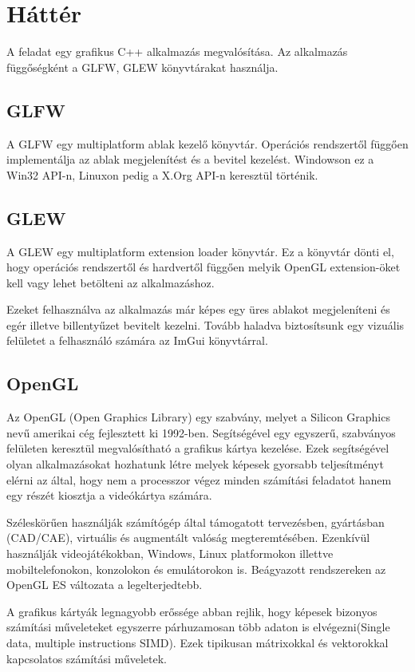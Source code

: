 \chapter{Háttér}

A feladat egy grafikus C++ alkalmazás megvalósítása. Az alkalmazás függőségként a GLFW, GLEW könyvtárakat használja.

\section{GLFW}
A GLFW egy multiplatform ablak kezelő könyvtár. Operációs rendszertől függően implementálja az ablak megjelenítést és a bevitel kezelést. Windowson ez a Win32 API-n, Linuxon pedig a X.Org API-n keresztül történik.

\section{GLEW}
A GLEW egy multiplatform extension loader könyvtár. Ez a könyvtár dönti el, hogy operációs rendszertől és hardvertől függően melyik OpenGL extension-öket kell vagy lehet betölteni az alkalmazáshoz.

Ezeket felhasználva az alkalmazás már képes egy üres ablakot megjeleníteni és egér illetve  billentyűzet bevitelt kezelni. Tovább haladva biztosítsunk egy vizuális felületet a felhasználó számára az ImGui könyvtárral.

\section{OpenGL}

Az OpenGL \cite{OpenGL} (Open Graphics Library) egy szabvány, melyet a Silicon Graphics nevű amerikai cég fejlesztett ki 1992-ben. Segítségével egy egyszerű, szabványos felületen keresztül megvalósítható a grafikus kártya kezelése. Ezek segítségével olyan alkalmazásokat hozhatunk létre melyek képesek gyorsabb teljesítményt elérni az által, hogy nem a processzor végez minden számítási feladatot hanem egy részét kiosztja a videókártya számára. 

Széleskörűen használják számítógép által támogatott tervezésben, gyártásban (CAD/CAE), virtuális és augmentált valóság megteremtésében. Ezenkívül használják videojátékokban, Windows, Linux platformokon illettve mobiltelefonokon, konzolokon és emulátorokon is. Beágyazott rendszereken az OpenGL ES változata a legelterjedtebb.

A grafikus kártyák legnagyobb erőssége abban rejlik, hogy képesek bizonyos számítási műveleteket egyszerre párhuzamosan több adaton is elvégezni(Single data, multiple instructions SIMD). Ezek tipikusan mátrixokkal és vektorokkal kapcsolatos számítási műveletek.

